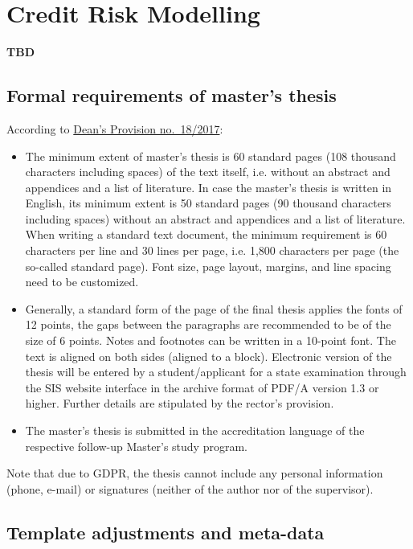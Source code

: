 \chapter{Credit Risk Modelling}
\label{chap:two}

\textbf{TBD}

\section{Formal requirements of master's thesis}
\label{sec:formal}

According to \href{https://www.fsv.cuni.cz/deans-provision-no-182017}{Dean's Provision no.\ 18/2017}:
\begin{itemize}
		\item  The minimum extent of master's thesis is 60 standard pages (108 thousand characters including spaces) of the text itself, i.e. without an abstract and appendices and a list of literature. 
		In case the master's thesis is written in English, its minimum extent is 50 standard pages (90 thousand characters including spaces) without an abstract and appendices and a list of literature. 
		When writing a standard text document, the minimum requirement is 60 characters per line and 30 lines per page, i.e. 1,800 characters per page (the so-called standard page). 
		Font size, page layout, margins, and line spacing need to be customized.
		\item Generally, a standard form of the page of the final thesis applies the fonts of 12 points, the gaps between the paragraphs are recommended to be of the size of 6 points. 
		Notes and footnotes can be written in a 10-point font.
		The text is aligned on both sides (aligned to a block). 
		Electronic version of the thesis will be entered by a student/applicant for a state examination through the SIS website interface in the archive format of PDF/A version 1.3 or higher. 
		Further details are stipulated by the rector's provision.
		\item The master's thesis is submitted in the accreditation language of the respective follow-up Master's study program. 
\end{itemize}

Note that due to GDPR, the thesis cannot include any personal information (phone, e-mail) or signatures (neither of the author nor of the supervisor).

\section{Template adjustments and meta-data}
\label{sec:metadata}

